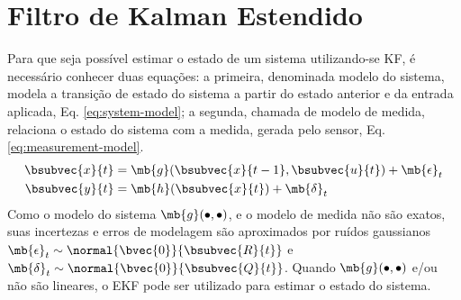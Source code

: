 \section{Filtro de Kalman Estendido}
\label{sec:ekf}
Para que seja possível estimar o estado de um sistema utilizando-se KF, é 
necessário conhecer duas equações: a primeira, denominada modelo do sistema, 
modela a transição de estado do sistema a partir do estado anterior e da entrada aplicada, Eq. \ref{eq:system-model}; a segunda, chamada de modelo de medida, relaciona o estado do sistema com a medida, gerada pelo sensor, Eq. \ref{eq:measurement-model}. 
\begin{align}
  \bsubvec{x}{t} &= \mb{g}(\bsubvec{x}{t-1}, \bsubvec{u}{t}) + \mb{\epsilon}_t
  \label{eq:system-model}\\
  \bsubvec{y}{t} &= \mb{h}(\bsubvec{x}{t}) + \mb{\delta}_t
  \label{eq:measurement-model}
\end{align}
\newcommand{\EKFSystemModel}{$\mb{g}(\bullet, \bullet)$}
Como o modelo do sistema \EKFSystemModel{}, e o modelo de medida \measurementModel{} não são exatos, suas incertezas e erros de modelagem são aproximados por ruídos gaussianos $\mb{\epsilon}_t \sim \normal{\bvec{0}}{\bsubvec{R}{t}}$ e $\mb{\delta}_t \sim \normal{\bvec{0}}{\bsubvec{Q}{t}}$. Quando \EKFSystemModel{} e/ou \measurementModel{} não são lineares, o EKF pode ser utilizado para estimar o estado 
do sistema. 

